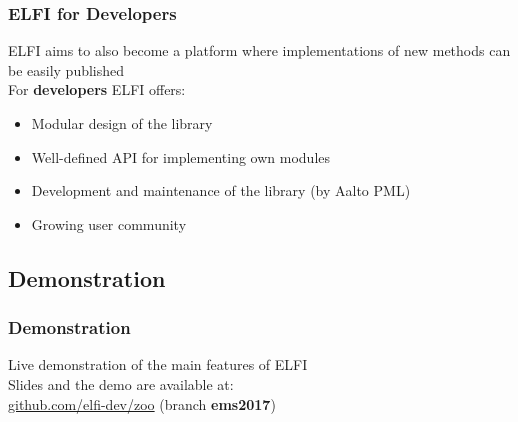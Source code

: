 \documentclass{beamer}
\begin{document}
\begin{frame}
\frametitle{ELFI for Developers}
ELFI aims to also become a platform where implementations of new methods can be easily published\\
\medskip
For \textbf{developers} ELFI offers:
\begin{itemize}
\item Modular design of the library
\item Well-defined API for implementing own modules
\item Development and maintenance of the library (by Aalto PML)
\item Growing user community
\end{itemize}
\end{frame}

\subsection{Demonstration}

\begin{frame}
\frametitle{Demonstration}
Live demonstration of the main features of ELFI\\
\medskip
Slides and the demo are available at:\\
\url{github.com/elfi-dev/zoo} (branch \textbf{ems2017})
\end{frame}
\end{document}

